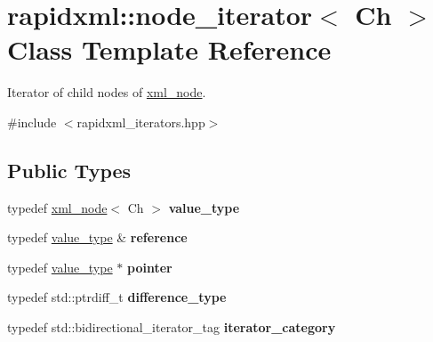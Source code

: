 \hypertarget{classrapidxml_1_1node__iterator}{}\section{rapidxml\+:\+:node\+\_\+iterator$<$ Ch $>$ Class Template Reference}
\label{classrapidxml_1_1node__iterator}


Iterator of child nodes of \hyperlink{classrapidxml_1_1xml__node}{xml\+\_\+node}.  




{\ttfamily \#include $<$rapidxml\+\_\+iterators.\+hpp$>$}

\subsection*{Public Types}
\begin{DoxyCompactItemize}
\item 
\mbox{\label{classrapidxml_1_1node__iterator_ade6310119ed1f72c94830e006fac69b7}} 
typedef \hyperlink{classrapidxml_1_1xml__node}{xml\+\_\+node}$<$ Ch $>$ {\bfseries value\+\_\+type}
\item 
\mbox{\label{classrapidxml_1_1node__iterator_af4a454358dc788ddbdfd91116b8dd1d6}} 
typedef \hyperlink{classrapidxml_1_1xml__node}{value\+\_\+type} \& {\bfseries reference}
\item 
\mbox{\label{classrapidxml_1_1node__iterator_aaedd3683c36f8b28a15c2cdf781983e9}} 
typedef \hyperlink{classrapidxml_1_1xml__node}{value\+\_\+type} $\ast$ {\bfseries pointer}
\item 
\mbox{\label{classrapidxml_1_1node__iterator_a5bdc462b980a52c5fa2d99ac9f4f4bff}} 
typedef std\+::ptrdiff\+\_\+t {\bfseries difference\+\_\+type}
\item 
\mbox{\label{classrapidxml_1_1node__iterator_a8e82d75f768e17bf7349d010ee26c037}} 
typedef std\+::bidirectional\+\_\+iterator\+\_\+tag {\bfseries iterator\+\_\+category}
\end{DoxyCompactItemize}

